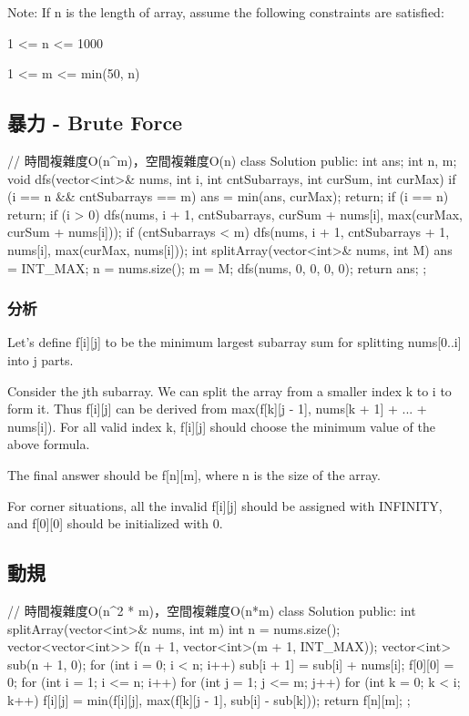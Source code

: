 Note:
If n is the length of array, assume the following constraints are satisfied:
\begindot
\item 1 <= n <= 1000
\item 1 <= m <= min(50, n)
\myenddot



\subsection{暴力 - Brute Force}
\begin{Code}
// 時間複雜度O(n^m)，空間複雜度O(n)
class Solution {
public:
    int ans;
    int n, m;
    void dfs(vector<int>& nums, int i, int cntSubarrays, int curSum, int curMax) {
        if (i == n && cntSubarrays == m) {
            ans = min(ans, curMax);
            return;
        }
        if (i == n) {
            return;
        }
        if (i > 0) {
            dfs(nums, i + 1, cntSubarrays, curSum + nums[i], max(curMax, curSum + nums[i]));
        }
        if (cntSubarrays < m) {
            dfs(nums, i + 1, cntSubarrays + 1, nums[i], max(curMax, nums[i]));
        }
    }
    int splitArray(vector<int>& nums, int M) {
        ans = INT_MAX;
        n = nums.size();
        m = M;
        dfs(nums, 0, 0, 0, 0);
        return ans;
    }
};
\end{Code}

\subsubsection{分析}
Let's define f[i][j] to be the minimum largest subarray sum for splitting nums[0..i] into j parts.

Consider the jth subarray. We can split the array from a smaller index k to i to form it. Thus f[i][j] can be derived from max(f[k][j - 1], nums[k + 1] + ... + nums[i]). For all valid index k, f[i][j] should choose the minimum value of the above formula.

The final answer should be f[n][m], where n is the size of the array.

For corner situations, all the invalid f[i][j] should be assigned with INFINITY, and f[0][0] should be initialized with 0.

\subsection{動規}
\begin{Code}
// 時間複雜度O(n^2 * m)，空間複雜度O(n*m)
class Solution {
public:
    int splitArray(vector<int>& nums, int m) {
        int n = nums.size();
        vector<vector<int>> f(n + 1, vector<int>(m + 1, INT_MAX));
        vector<int> sub(n + 1, 0);
        for (int i = 0; i < n; i++) {
            sub[i + 1] = sub[i] + nums[i];
        }
        f[0][0] = 0;
        for (int i = 1; i <= n; i++) {
            for (int j = 1; j <= m; j++) {
                for (int k = 0; k < i; k++) {
                    f[i][j] = min(f[i][j], max(f[k][j - 1], sub[i] - sub[k]));
                }
            }
        }
        return f[n][m];
    }
};
\end{Code}

